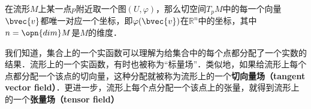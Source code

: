 
在流形$M$上某一点$p$附近取一个图$(U, \varphi)$，那么切空间$T_pM$中的每一个向量$\bvec{v}$都唯一对应一个坐标，即$\varphi(\bvec{v})$在$\mathbb{R}^n$中的坐标，其中$n=\opn{dim}M$是$M$的维度．

我们知道，集合上的一个实函数可以理解为给集合中的每个点都分配了一个实数的结果．流形上的一个实函数，有时也被称为“标量场”．类似地，如果给流形上每个点都分配一个该点的切向量，这种分配就被称为流形上的一个\textbf{切向量场（tangent vector field）}．更进一步，流形上每个点分配一个该点上的张量，就得到流形上的一个\textbf{张量场（tensor field）}





